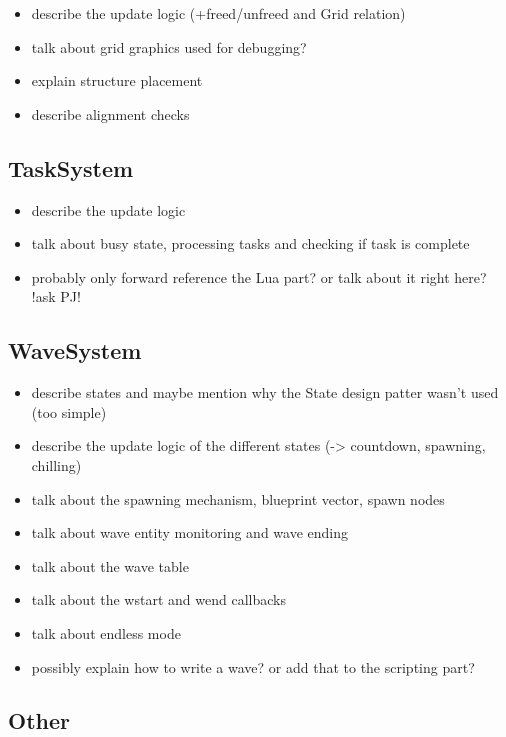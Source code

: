 \begin{itemize}
    \item describe the update logic (+freed/unfreed and Grid relation)
    \item talk about grid graphics used for debugging?
    \item explain structure placement
    \item describe alignment checks
\end{itemize}

\subsection{TaskSystem}

\begin{itemize}
    \item describe the update logic
    \item talk about busy state, processing tasks and checking if task is complete
    \item probably only forward reference the Lua part? or talk about it right here? !ask PJ!
\end{itemize}

\subsection{WaveSystem}

\begin{itemize}
    \item describe states and maybe mention why the State design patter wasn't used (too simple)
    \item describe the update logic of the different states (-> countdown, spawning, chilling)
    \item talk about the spawning mechanism, blueprint vector, spawn nodes
    \item talk about wave entity monitoring and wave ending
    \item talk about the wave table
    \item talk about the wstart and wend callbacks
    \item talk about endless mode
    \item possibly explain how to write a wave? or add that to the scripting part?
\end{itemize}

\subsection{Other}

